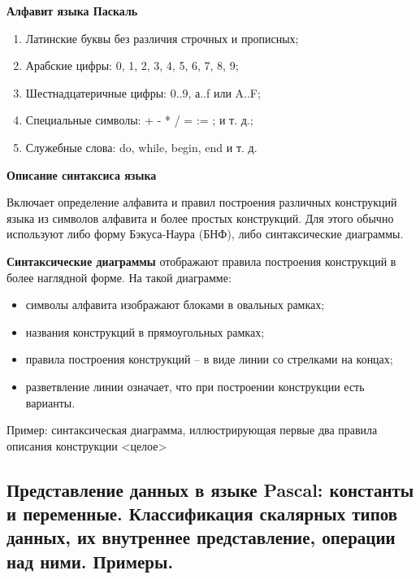 {\bf{Алфавит языка Паскаль  }}

\begin{enumerate}
\item Латинские буквы без различия строчных и прописных;
\item Арабские цифры: 0, 1, 2, 3, 4, 5, 6, 7, 8, 9;
\item Шестнадцатеричные цифры: 0..9, а..f или A..F;
\item Специальные символы: + - * / = := ; и т. д.;
\item Служебные слова: do, while, begin, end и т. д.
\end{enumerate}

{\bf{Описание синтаксиса языка}}

Включает определение алфавита и правил построения различных конструкций языка из символов алфавита и более простых конструкций. Для этого обычно используют либо форму Бэкуса-Наура (БНФ), либо синтаксические диаграммы.

{\bf{Синтаксические диаграммы}}
отображают правила построения конструкций в более наглядной форме.
На такой диаграмме:
\begin{itemize}
\item символы алфавита изображают блоками в овальных рамках;
\item названия конструкций в прямоугольных рамках;
\item правила построения конструкций – в виде линии со стрелками на концах;
\item разветвление линии означает, что при построении конструкции есть варианты. 
\end{itemize}
Пример: синтаксическая диаграмма, иллюстрирующая первые два правила описания конструкции <целое>



\newpage\subsection{Представление  данных  в  языке  Pascal:  константы  и  переменные.  Классификация  скалярных типов данных, их внутреннее представление, операции над ними. Примеры.} 

\begin{myquote}

\end{myquote}

